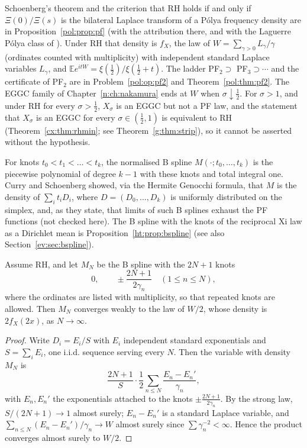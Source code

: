 Schoenberg's theorem and the criterion that RH holds if and only if $\Xi(0)/\Xi(s)$ is the bilateral Laplace transform of a P\'olya frequency density are in Proposition~\ref{pol:prop:pf} (with the attribution there, and with the Laguerre P\'olya class of \cite{Schoenberg51}). Under RH that density is $f_X$, the law of $W=\sum_{\gamma>0}L_\gamma/\gamma$ (ordinates counted with multiplicity) with independent standard Laplace variables $L_\gamma$, and $\mathbb Ee^{itW}=\xi(\frac12)/\xi(\frac12+t)$. The ladder PF$_2\supset$ PF$_3\supset\cdots$ and the certificate of PF$_2$ are in Problem~\ref{pol:op:pf2} and Theorem~\ref{pol:thm:pf2}. The EGGC family of Chapter~\ref{n:ch:nakamura} ends at $W$ when $\sigma\downarrow\frac12$. For $\sigma>1$, and under RH for every $\sigma>\frac12$, $X_\sigma$ is an EGGC but not a PF law, and the statement that $X_\sigma$ is an EGGC for every $\sigma\in(\frac12,1)$ is equivalent to RH (Theorem~\ref{cx:thm:rhmin}; see Theorem~\ref{g:thm:strip}), so it cannot be asserted without the hypothesis.

For knots $t_0<t_1<\dots<t_k$, the normalised B spline $M(\cdot;t_0,\dots,t_k)$ is the piecewise polynomial of degree $k-1$ with these knots and total integral one. Curry and Schoenberg \cite{CurrySchoenberg66} showed, via the Hermite Genocchi formula, that $M$ is the density of $\sum_it_iD_i$, where $D=(D_0,\dots,D_k)$ is uniformly distributed on the simplex, and, as they state, that limits of such B splines exhaust the PF functions (not checked here). The B spline with the knots of the reciprocal Xi law as a Dirichlet mean is Proposition~\ref{ht:prop:bspline} (see also Section~\ref{ev:sec:bspline}).

\begin{proposition}\label{g:prop:bspline}
Assume RH, and let $M_N$ be the B spline with the $2N+1$ knots
\[
0,\qquad\pm\frac{2N+1}{2\gamma_n}\quad(1\le n\le N),
\]
where the ordinates are listed with multiplicity, so that repeated knots are allowed. Then $M_N$ converges weakly to the law of $W/2$, whose density is $2f_X(2x)$, as $N\to\infty$.
\end{proposition}

\begin{proof}
Write $D_i=E_i/S$ with $E_i$ independent standard exponentials and $S=\sum_iE_i$, one i.i.d. sequence serving every $N$. Then the variable with density $M_N$ is
\[
\frac{2N+1}{S}\cdot\frac12\sum_{n\le N}\frac{E_n-E_n'}{\gamma_n},
\]
with $E_n,E_n'$ the exponentials attached to the knots $\pm\frac{2N+1}{2\gamma_n}$. By the strong law, $S/(2N+1)\to1$ almost surely; $E_n-E_n'$ is a standard Laplace variable, and $\sum_{n\le N}(E_n-E_n')/\gamma_n\to W$ almost surely since $\sum\gamma_n^{-2}<\infty$. Hence the product converges almost surely to $W/2$.
\end{proof}

